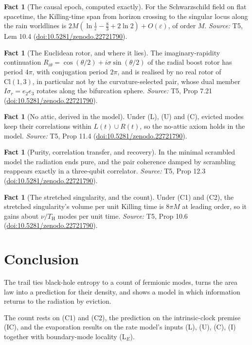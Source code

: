 \documentclass[11pt]{article}
\theoremstyle{definition}
\newtheorem{fact}[theorem]{Fact}
\theoremstyle{plain}
\providecommand{\Cl}{}\renewcommand{\Cl}{\mathrm{Cl}}
\providecommand{\TH}{}\renewcommand{\TH}{T_{\mathrm{H}}}
\begin{document}
\begin{fact}[The causal epoch, computed exactly]\label{c:singularity.causal-epoch-computed-exactly}
For the Schwarzschild field on flat spacetime, the Killing-time span from horizon crossing to the singular locus along the rain worldlines is $2M(\ln\tfrac{1}{\varepsilon} - \tfrac83 + 2\ln 2) + O(\varepsilon)$, of order $M$.
\emph{Source:} T5, Lem 10.4 (\href{https://doi.org/10.5281/zenodo.22721790}{doi:10.5281/zenodo.22721790}).
\end{fact}

\begin{fact}[The Euclidean rotor, and where it lies]\label{c:singularity.euclidean-rotor-where-it-lies}
The imaginary-rapidity continuation $R_{i\theta} = \cos(\theta/2) + i\sigma\sin(\theta/2)$ of the radial boost rotor has period $4\pi$, with conjugation period $2\pi$, and is realised by no real rotor of $\Cl(1,3)$, in particular not by the curvature-selected pair, whose dual member $I\sigma_r = e_2e_3$ rotates along the bifurcation sphere.
\emph{Source:} T5, Prop 7.21 (\href{https://doi.org/10.5281/zenodo.22721790}{doi:10.5281/zenodo.22721790}).
\end{fact}

\begin{fact}[No attic, derived in the model]\label{c:singularity.no-attic-derived-model}
Under (L), (U) and (C), evicted modes keep their correlations within $L(t) \cup R(t)$, so the no-attic axiom holds in the model.
\emph{Source:} T5, Prop 11.4 (\href{https://doi.org/10.5281/zenodo.22721790}{doi:10.5281/zenodo.22721790}).
\end{fact}

\begin{fact}[Purity, correlation transfer, and recovery]\label{c:singularity.purity-correlation-transfer-recovery}
In the minimal scrambled model the radiation ends pure, and the pair coherence damped by scrambling reappears exactly in a three-qubit correlator.
\emph{Source:} T5, Prop 12.3 (\href{https://doi.org/10.5281/zenodo.22721790}{doi:10.5281/zenodo.22721790}).
\end{fact}

\begin{fact}[The stretched singularity, and the count]\label{c:singularity.stretched-singularity-count}
Under (C1) and (C2), the stretched singularity's volume per unit Killing time is $8\pi M$ at leading order, so it gains about $\nu/\TH$ modes per unit time.
\emph{Source:} T5, Prop 10.6 (\href{https://doi.org/10.5281/zenodo.22721790}{doi:10.5281/zenodo.22721790}).
\end{fact}

\section*{Conclusion}
The trail ties black-hole entropy to a count of fermionic modes, turns the area law into a prediction for their density, and shows a model in which information returns to the radiation by eviction.

The count rests on (C1) and (C2), the prediction on the intrinsic-clock premise (IC), and the evaporation results on the rate model's inputs (L), (U), (C), (I) together with boundary-mode locality (L$_E$).
\end{document}
